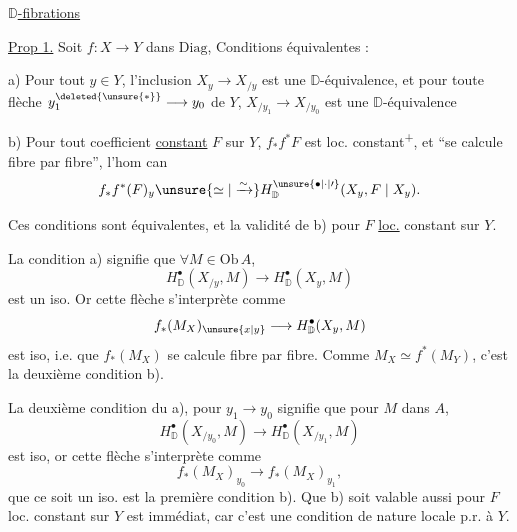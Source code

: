 
\uline{$\mathbb D$-fibrations}

\uline{Prop 1.} Soit $f:X\longrightarrow Y$ dans $\mathrm{Diag}$, Conditions équivalentes :

a) Pour  tout $y\in Y$, l'inclusion $X_y\longrightarrow X_{/y}$ est une $\mathbb D$-équivalence, et pour toute flèche $y_1^{\deleted{\unsure{*}}}\longrightarrow y_0$ de $Y$, $X_{/y_1}\longrightarrow X_{/y_0}$ est une $\mathbb D$-équivalence

b) Pour tout  coefficient  \uline{constant} $F$ sur $Y$, $f_*f^*F$ est loc. constant\textsuperscript{+}, et ``se calcule fibre par fibre'', l'hom can
\[
f_* f^*(F)_y \unsure{\simeq|\xrightarrow{\sim}} H^{\unsure{\bullet|\cdot|\prime}}_{\mathbb D}(X_y,F\mid X_y).
\]


Ces conditions sont équivalentes, et   la validité de b) pour  $F$ \uline{loc.} constant sur $Y$.

La  condition  a) signifie que  $\forall M\in\mathrm{Ob}\,A$, 
\[
H^\bullet_{\mathbb D}(X_{/y},M)\longrightarrow H^\bullet_{\mathbb D}(X_y,M)
\]
est un iso. Or cette flèche s'interprète comme
\[
f_*(M_X)_{\unsure{x|y}}\longrightarrow H^\bullet_{\mathbb D}(X_y,M)
\]
est iso, i.e. que $f_*(M_X)$ se calcule fibre par fibre. Comme $M_X\simeq f^*(M_Y)$, c'est la deuxième condition b).

La deuxième condition du a), pour $y_1\longrightarrow y_0$ signifie que pour $M$ dans $A$,
\[
H^\bullet_{\mathbb D}(X_{/y_0},M)\longrightarrow H^\bullet_{\mathbb D}(X_{/y_1},M)
\]
est iso,  or cette flèche s'interprète comme
\[
f_*(M_X)_{y_0}\longrightarrow f_*(M_X)_{y_1},
\]
que ce soit  un iso. est la première condition b). Que b) soit valable aussi pour $F$ loc. constant sur $Y$ est immédiat, car c'est une condition de nature locale p.r. à $Y$.
